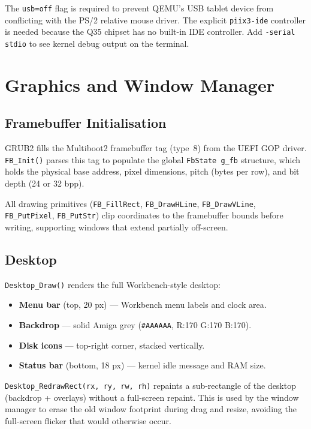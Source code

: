 \documentclass[11pt,a4paper]{report}
\begin{document}
The \texttt{usb=off} flag is required to prevent QEMU's USB tablet device
from conflicting with the PS/2 relative mouse driver. The explicit
\texttt{piix3-ide} controller is needed because the Q35 chipset has no
built-in IDE controller. Add \texttt{-serial stdio} to see kernel debug
output on the terminal.

\chapter{Graphics and Window Manager}

\section{Framebuffer Initialisation}

GRUB2 fills the Multiboot2 framebuffer tag (type~8) from the UEFI GOP driver.
\texttt{FB\_Init()} parses this tag to populate the global \texttt{FbState g\_fb}
structure, which holds the physical base address, pixel dimensions, pitch
(bytes per row), and bit depth (24 or 32 bpp).

All drawing primitives (\texttt{FB\_FillRect}, \texttt{FB\_DrawHLine},
\texttt{FB\_DrawVLine}, \texttt{FB\_PutPixel}, \texttt{FB\_PutStr}) clip
coordinates to the framebuffer bounds before writing, supporting windows
that extend partially off-screen.

\section{Desktop}

\texttt{Desktop\_Draw()} renders the full Workbench-style desktop:
\begin{itemize}
    \item \textbf{Menu bar} (top, 20 px) --- Workbench menu labels and clock area.
    \item \textbf{Backdrop} --- solid Amiga grey (\texttt{\#AAAAAA}, R:170 G:170 B:170).
    \item \textbf{Disk icons} --- top-right corner, stacked vertically.
    \item \textbf{Status bar} (bottom, 18 px) --- kernel idle message and RAM size.
\end{itemize}

\texttt{Desktop\_RedrawRect(rx, ry, rw, rh)} repaints a sub-rectangle of the
desktop (backdrop + overlays) without a full-screen repaint.  This is used
by the window manager to erase the old window footprint during drag and resize,
avoiding the full-screen flicker that would otherwise occur.
\end{document}

